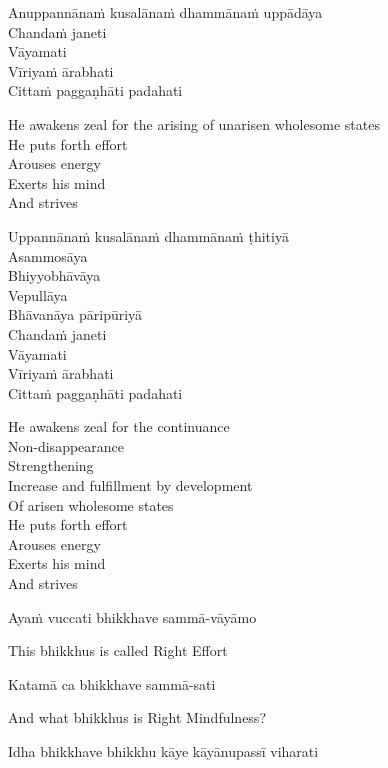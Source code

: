 Anuppannānaṁ kusalānaṁ dhammānaṁ uppādāya\\
Chandaṁ janeti\\
Vāyamati\\
Vīriyaṁ ārabhati\\
Cittaṁ paggaṇhāti padahati

\begin{english-verses}
  He awakens zeal for the arising of unarisen wholesome states\\
  He puts forth effort\\
  Arouses energy\\
  Exerts his mind\\
  And strives
\end{english-verses}

Uppannānaṁ kusalānaṁ dhammānaṁ ṭhitiyā\\
Asammosāya\\
Bhiyyobhāvāya\\
Vepullāya\\
Bhāvanāya pāripūriyā\\
Chandaṁ janeti\\
Vāyamati\\
Vīriyaṁ ārabhati\\
Cittaṁ paggaṇhāti padahati

\begin{english-verses}
  He awakens zeal for the continuance\\
  Non-disappearance\\
  Strengthening\\
  Increase and fulfillment by development\\
  Of arisen wholesome states\\
  He puts forth effort\\
  Arouses energy\\
  Exerts his mind\\
  And strives
\end{english-verses}

Ayaṁ vuccati bhikkhave sammā-vāyāmo

\begin{english}
  This bhikkhus is called Right Effort
\end{english}

Katamā ca bhikkhave sammā-sati

\begin{english}
  And what bhikkhus is Right Mindfulness?
\end{english}

Idha bhikkhave bhikkhu kāye kāyānupassī viharati

